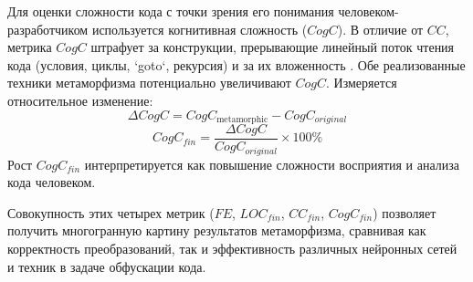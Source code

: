 Для оценки сложности кода с точки зрения его понимания человеком-разработчиком используется когнитивная сложность ($CogC$). В отличие от $CC$, метрика $CogC$ штрафует за конструкции, прерывающие линейный поток чтения кода (условия, циклы, `goto`, рекурсия) и за их вложенность \cite{SonarSourceCogC}. Обе реализованные техники метаморфизма потенциально увеличивают $CogC$. Измеряется относительное изменение:
\[ \Delta CogC = CogC_{\text{metamorphic}} - CogC_{original} \]
\[ CogC_{fin} = \frac{\Delta CogC}{CogC_{original}} \times 100\% \]
Рост $CogC_{fin}$ интерпретируется как повышение сложности восприятия и анализа кода человеком.

Совокупность этих четырех метрик ($FE$, $LOC_{fin}$, $CC_{fin}$, $CogC_{fin}$) позволяет получить многогранную картину результатов метаморфизма, сравнивая как корректность преобразований, так и эффективность различных нейронных сетей и техник в задаче обфускации кода.